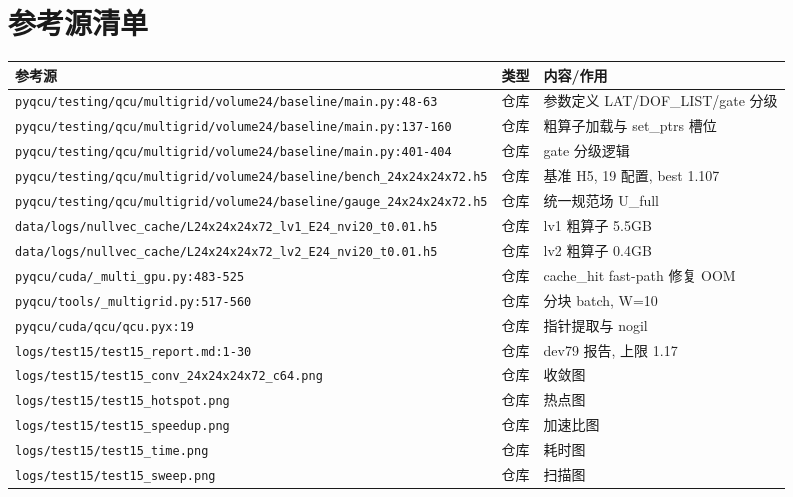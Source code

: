 \documentclass[UTF8]{ctexart}
\begin{document}
\section{参考源清单}
\begin{xltabular}{\textwidth}{llX}
\toprule
\textcolor{evidence}{参考源} & 类型 & 内容/作用 \\
\midrule
\endhead
\texttt{\nolinkurl{pyqcu/testing/qcu/multigrid/volume24/baseline/main.py:48-63}} & 仓库 & 参数定义 LAT/DOF\_LIST/gate 分级 \\
\texttt{\nolinkurl{pyqcu/testing/qcu/multigrid/volume24/baseline/main.py:137-160}} & 仓库 & 粗算子加载与 set\_ptrs 槽位 \\
\texttt{\nolinkurl{pyqcu/testing/qcu/multigrid/volume24/baseline/main.py:401-404}} & 仓库 & gate 分级逻辑 \\
\texttt{\nolinkurl{pyqcu/testing/qcu/multigrid/volume24/baseline/bench_24x24x24x72.h5}} & 仓库 & 基准 H5, 19 配置, best 1.107 \\
\texttt{\nolinkurl{pyqcu/testing/qcu/multigrid/volume24/baseline/gauge_24x24x24x72.h5}} & 仓库 & 统一规范场 U\_full \\
\texttt{\nolinkurl{data/logs/nullvec_cache/L24x24x24x72_lv1_E24_nvi20_t0.01.h5}} & 仓库 & lv1 粗算子 5.5GB \\
\texttt{\nolinkurl{data/logs/nullvec_cache/L24x24x24x72_lv2_E24_nvi20_t0.01.h5}} & 仓库 & lv2 粗算子 0.4GB \\
\texttt{\nolinkurl{pyqcu/cuda/_multi_gpu.py:483-525}} & 仓库 & cache\_hit fast-path 修复 OOM \\
\texttt{\nolinkurl{pyqcu/tools/_multigrid.py:517-560}} & 仓库 & 分块 batch, W=10 \\
\texttt{\nolinkurl{pyqcu/cuda/qcu/qcu.pyx:19}} & 仓库 & 指针提取与 nogil \\
\texttt{\nolinkurl{logs/test15/test15_report.md:1-30}} & 仓库 & dev79 报告, 上限 1.17 \\
\texttt{\nolinkurl{logs/test15/test15_conv_24x24x24x72_c64.png}} & 仓库 & 收敛图 \\
\texttt{\nolinkurl{logs/test15/test15_hotspot.png}} & 仓库 & 热点图 \\
\texttt{\nolinkurl{logs/test15/test15_speedup.png}} & 仓库 & 加速比图 \\
\texttt{\nolinkurl{logs/test15/test15_time.png}} & 仓库 & 耗时图 \\
\texttt{\nolinkurl{logs/test15/test15_sweep.png}} & 仓库 & 扫描图 \\

\end{xltabular}
\end{document}
